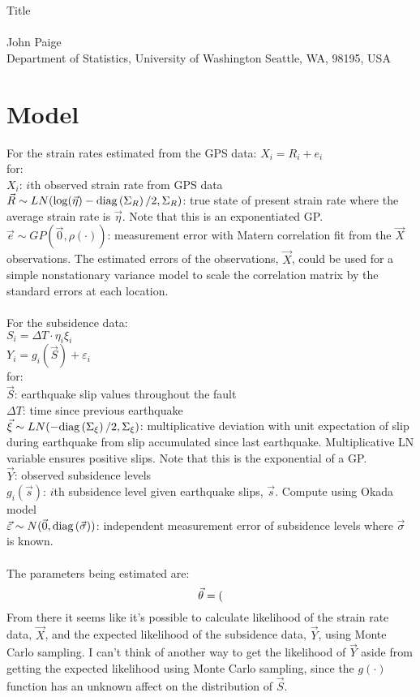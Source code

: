 \documentclass{uwstat572}
\newcommand{\diag}[1]{\text{diag}\paren{#1}}
\begin{document}
\begin{center}
  {\LARGE Title}\\\ \\
  {John Paige \\ 
    Department of Statistics, University of Washington Seattle, WA, 98195, USA
  }
\end{center}


\section{Model}
\label{model}
For the strain rates estimated from the GPS data:
$X_i = R_i + e_i$\\
for:\\
$X_i$: $i$th observed strain rate from GPS data\\
$\vec{R} \sim LN(\log(\vec{\eta}) - \diag{\Sigma_R}/2, \Sigma_R)$: true state of present strain rate where the average strain rate is $\vec{\eta}$.  Note that this is an exponentiated GP.\\
$\vec{e} \sim GP(\vec{0}, \rho(\cdot))$: measurement error with Matern correlation fit from the $\vec{X}$ observations.  The estimated errors of the observations, $\vec{X}$, could be used for a simple nonstationary variance model to scale the correlation matrix by the standard errors at each location.
\\\\
For the subsidence data:\\
$S_i = \Delta T \cdot \eta_i \xi_i$\\
$Y_i = g_i(\vec{S}) + \varepsilon_i$\\
for:\\
$\vec{S}$: earthquake slip values throughout the fault\\
$\Delta T$: time since previous earthquake\\
$\vec{\xi} \sim LN(-\diag{\Sigma_\xi}/2, \Sigma_\xi)$: multiplicative deviation with unit expectation of slip during earthquake from slip accumulated since last earthquake.  Multiplicative LN variable ensures positive slips.  Note that this is the exponential of a GP.\\
$\vec{Y}$: observed subsidence levels\\
$g_i(\vec{s})$: $i$th subsidence level given earthquake slips, $\vec{s}$.  Compute using Okada model\\
$\vec{\varepsilon} \sim N(\vec{0}, \diag{\vec{\sigma}})$: independent measurement error of subsidence levels where $\vec{\sigma}$ is known.
\\\\
The parameters being estimated are:
$$ \vec{\theta} = ($$
From there it seems like it's possible to calculate likelihood of the strain rate data, $\vec{X}$, and the expected likelihood of the subsidence data, $\vec{Y}$, using Monte Carlo sampling.  I can't think of another way to get the likelihood of $\vec{Y}$ aside from getting the expected likelihood using Monte Carlo sampling, since the $g(\cdot)$ function has an unknown affect on the distribution of $\vec{S}$.

%
\end{document}
